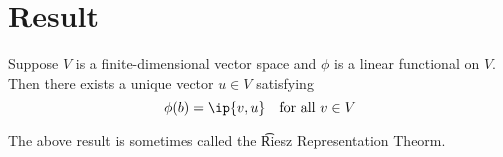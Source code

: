 
\section*{Result}

\begin{proposition}
Suppose $V$ is a finite-dimensional vector space and $\phi $ is a linear functional on $V$.
Then there exists a unique vector $u \in V$ satisfying
\[
\phi (b) = \ip{v, u} \quad \text{for all } v \in V
\]
\end{proposition}

The above result is sometimes called the \t{Riesz Representation Theorm}.

\blankpage